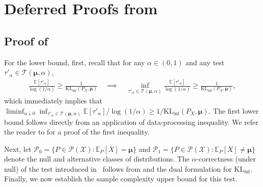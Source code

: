 \documentclass{article}
\theoremstyle{plain}
\theoremstyle{definition}
\newcommand{\KLinf}{\operatorname{KL_{inf}}}
\newcommand{\calP}{\mathcal P}
\newcommand{\calX}{\mathcal X}
\newcommand{\calT}{\mathcal T}
\newcommand{\boldmu}{\boldsymbol{\mu}}
\begin{document}
\section{Deferred Proofs from~}
\label{proof:statistical-applications}


\subsection{Proof of~}
\label{proof:sequential-testing}

For the lower bound, first, recall that for any $\alpha\in(0,1)$ and any test $\tau'_\alpha \in \mathcal T(\boldmu, \alpha)$, 
\begin{align}
    \frac{\mathbb{E}[\tau'_\alpha]}{\log(1/\alpha)} \geq \frac{1}{\KLinf(P_X, \boldmu)} \quad \implies \quad \inf_{\tau'_\alpha \in \calT(\boldmu, \alpha)}\frac{\mathbb{E}[\tau'_\alpha]}{\log(1/\alpha)}  \geq \frac{1}{\KLinf(P_X, \boldmu)}, 
\end{align}
which immediately implies that $\liminf_{\alpha \downarrow 0} \inf_{\tau'_\alpha \in \calT(\boldmu, \alpha)} \mathbb{E}[\tau'_\alpha]/\log(1/\alpha) \geq 1/\KLinf(P_X, \boldmu)$. The first lower bound follows directly from an application of data-processing inequality. We refer the reader to \citet[Theorem 3.1]{agrawal2025stopping} for a proof of the first inequality.

Next, let $\calP_0 = \{P \in \calP(\calX): \mathbb{E}_{P}[X] = \boldmu\}$ and $\calP_1 = \{P \in \calP(\calX): \mathbb{E}_{P}[X] \not = \boldmu\}$ denote the null and alternative classes of distributions. The $\alpha$-correctness (under null) of the test introduced in~ follows from \citet[Lemma F.1]{agrawal2021optimal} and the dual formulation for $\KLinf$. \\ 

Finally, we now establish the sample complexity upper bound for this test.\\
\end{document}
